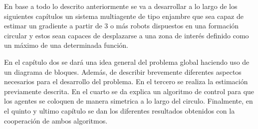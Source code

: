 En base a todo lo descrito anteriormente se va a desarrollar a lo largo de los siguientes capítulos un  sistema multiagente de tipo enjambre que sea capaz de estimar un gradiente a partir de 3 o más robots dispuestos en una formación circular y estos sean capaces de desplazarse a una zona de interés definido como un máximo de una determinada función.

En el capítulo dos se dará una idea general del problema global haciendo uso de un diagrama de bloques. Además, de describir brevemente diferentes aspectos necesarios para el desarrollo del problema. En el tercero se realiza la estimación previamente descrita. En el cuarto se da explica un algoritmo de control para que los agentes se coloquen de manera simetrica a lo largo del circulo. Finalmente, en el quinto y ultimo capítulo se dan los diferentes resultados obtenidos con la cooperación de ambos algoritmos.
